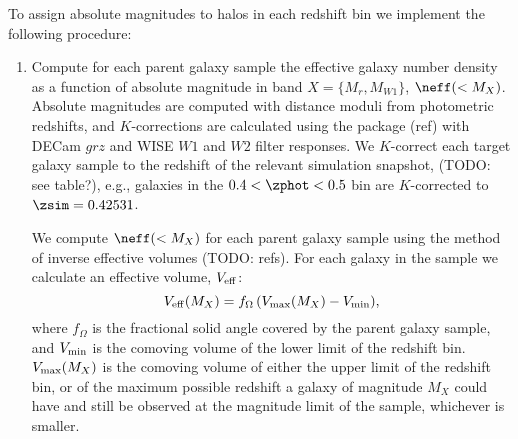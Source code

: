 \documentclass[twocolumn,apj,iop,tighten]{emulateapj2}
\begin{document}
To assign absolute magnitudes to halos in each redshift bin we implement the following procedure:
%
\begin{enumerate}[leftmargin=0pt, itemindent=24pt, listparindent=10pt, label=(\arabic*), nosep]
\item \label{step:neff}
Compute for each parent galaxy sample the effective galaxy number density as a function of absolute magnitude in band ${X=\{M_r, M_{W1}\}}$, $\neff(<M_X)$. Absolute magnitudes are computed with distance moduli from photometric redshifts, and $K$-corrections are calculated using the \idl package \kcorrect (ref) with DECam $grz$ and WISE $W1$ and $W2$ filter responses. We $K$-correct each target galaxy sample to the redshift of the relevant simulation snapshot, \zsim (TODO: see table?), e.g., galaxies in the ${0.4 < \zphot < 0.5}$ bin are $K$-corrected to $\zsim=0.42531$.

We compute $\neff(<M_X)$ for each parent galaxy sample using the method of inverse effective volumes (TODO: refs). For each galaxy in the sample we calculate an effective volume, $V_{\rm eff}$:
%
\begin{equation}
{V_{\rm eff}(M_X) = f_\Omega \left( V_{\rm max}(M_X)-V_{\rm min} \right)},
\end{equation}
%
\noindent where $f_\Omega$ is the fractional solid angle covered by the parent galaxy sample, and $V_{\rm min}$ is the comoving volume of the lower limit of the redshift bin. $V_{\rm max}(M_X)$ is the comoving volume of either the upper limit of the redshift bin, or of the maximum possible redshift a galaxy of magnitude $M_X$ could have and still be observed at the magnitude limit of the sample, whichever is smaller.


\end{enumerate}
\end{document}
